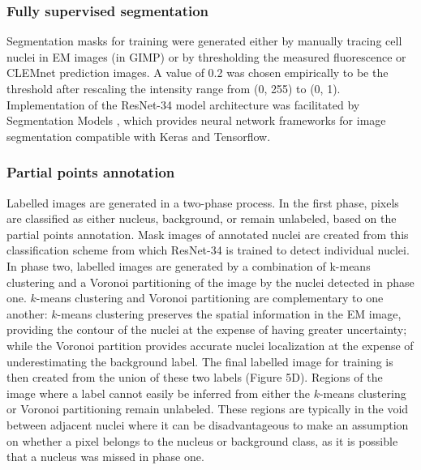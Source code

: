 \subsubsection{Fully supervised segmentation}

Segmentation masks for training were generated either by manually tracing cell nuclei in EM images (in GIMP) or by thresholding the measured fluorescence or CLEMnet prediction images. A value of 0.2 was chosen empirically to be the threshold after rescaling the intensity range from (0, 255) to (0, 1). Implementation of the ResNet-34 model architecture was facilitated by Segmentation Models \cite{Yakubovskiy:2019}, which provides neural network frameworks for image segmentation compatible with Keras and Tensorflow.


\subsubsection{Partial points annotation}

Labelled images are generated in a two-phase process. In the first phase, pixels are classified as either nucleus, background, or remain unlabeled, based on the partial points annotation. Mask images of annotated nuclei are created from this classification scheme from which ResNet-34 is trained to detect individual nuclei. In phase two, labelled images are generated by a combination of k-means clustering and a Voronoi partitioning of the image by the nuclei detected in phase one. $k$-means clustering and Voronoi partitioning are complementary to one another: $k$-means clustering preserves the spatial information in the EM image, providing the contour of the nuclei at the expense of having greater uncertainty; while the Voronoi partition provides accurate nuclei localization at the expense of underestimating the background label. The final labelled image for training is then created from the union of these two labels (Figure 5D). Regions of the image where a label cannot easily be inferred from either the $k$-means clustering or Voronoi partitioning remain unlabeled. These regions are typically in the void between adjacent nuclei where it can be disadvantageous to make an assumption on whether a pixel belongs to the nucleus or background class, as it is possible that a nucleus was missed in phase one.



